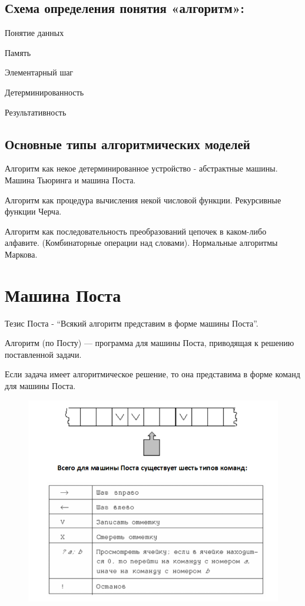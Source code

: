 \documentclass{article}
\begin{document}
\subsection{Схема определения понятия «алгоритм»:}

Понятие данных

Память

Элементарный шаг

Детерминированность

Результативность

\subsection{Основные типы алгоритмических моделей}
Алгоритм как некое детерминированное устройство - абстрактные машины. 
Машина Тьюринга и машина Поста.

Алгоритм как процедура вычисления некой числовой функции. Рекурсивные функции Черча.

Алгоритм как последовательность преобразований цепочек в каком-либо алфавите.
(Комбинаторные операции над словами). Нормальные алгоритмы Маркова.

\section{Машина Поста}

Тезис Поста - “Всякий алгоритм представим в форме машины Поста”.

Алгоритм (по Посту) — программа для машины Поста, приводящая к решению поставленной задачи.

Если задача имеет алгоритмическое решение, то она представима в форме команд для машины Поста.


\begin{figure}
    \centering
    \includegraphics[width=1\linewidth]{Снимок экрана 2025-02-25 090545.png}
\end{figure}
\end{document}
